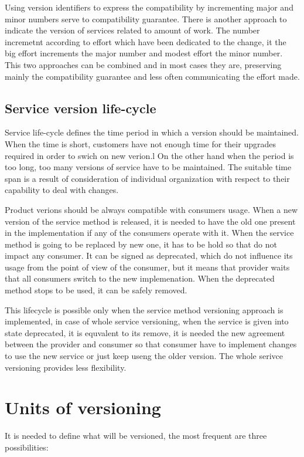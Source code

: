 Using version identifiers to express the compatibility by incrementing major and minor numbers serve to compatibility guarantee. There is another approach to indicate the version of services related to amount of work. The number incremetnt according to effort which have been dedicated to the change, it the big effort increments the major number and modest effort the minor number. This two approaches can be combined and in most cases they are, preserving mainly the compatibility guarantee and less often communicating the effort made. \cite{soa-governance}


\subsection{Service version life-cycle}
Service life-cycle defines the time period in which a version should be maintained. When the time is short, customers have not enough time for their upgrades required in order to swich on new verion.l On the other hand when the period is too long, too many versions of service have to be maintained. The suitable time span is a result of consideration of individual organization with respect to their capability to deal with changes.

Product verions should be always compatible with consumers usage. When a new version of the service method is released, it is needed to have the old one present in the implementation if any of the consumers operate with it. When the service method is going to be replaced by new one, it has to be hold so that do not impact any consumer. It can be signed as deprecated, which do not influence its usage from the point of view of the consumer, but it means that provider waits that all consumers switch to the new implemenation. When the deprecated method stops to be used, it can be safely removed. 

This lifecycle is possible only when the service method versioning approach is implemented, in case of whole service versioning, when the service is given into state deprecated, it is equvalent to its remove, it is needed the new agreement between the provider and consumer so that consumer have to implement changes to use the new service or just  keep useng the older version. The whole serivce versioning provides less flexibility.

\section{Units of versioning}
It is needed to define what will be versioned, the most frequent are three possibilities:

